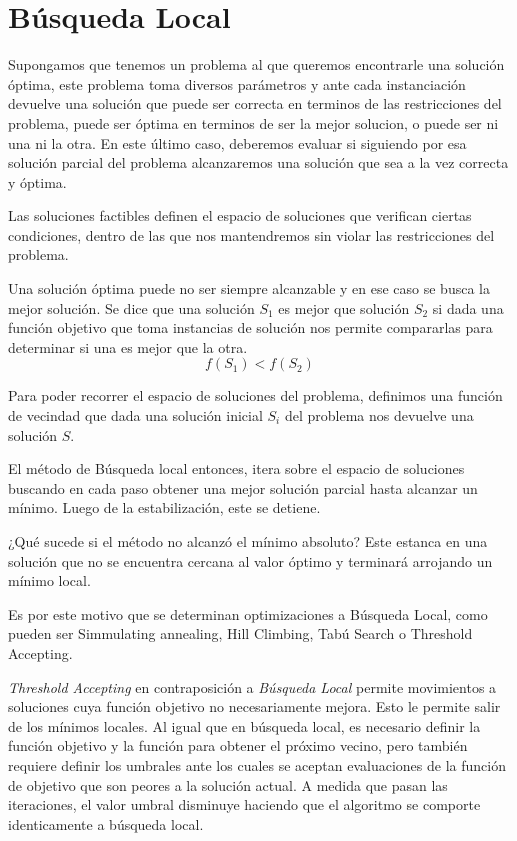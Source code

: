 \documentclass[a4paper,spanish]{article}
\begin{document}
\section{Búsqueda Local}

Supongamos que tenemos un problema al que queremos encontrarle una solución
óptima, este problema toma diversos parámetros y ante cada instanciación
devuelve una solución que puede ser correcta en terminos de las restricciones
del problema, puede ser óptima en terminos de ser la mejor solucion, o puede ser
ni una ni la otra. En este último caso, deberemos evaluar si siguiendo por esa
solución parcial del problema alcanzaremos una solución que sea a la vez
correcta y óptima.

Las soluciones factibles definen el espacio de soluciones que verifican ciertas
condiciones, dentro de las que nos mantendremos sin violar las restricciones del
problema.

Una solución óptima puede no ser siempre alcanzable y en ese caso se busca la
mejor solución. Se dice que una solución $S_1$ es mejor que solución $S_2$ si
dada una función objetivo  que toma instancias de solución nos permite
compararlas para determinar si una es mejor que la otra.
\begin{equation}
    f(S_1) < f(S_2) 
\end{equation}

Para poder recorrer el espacio de soluciones del problema, definimos una función
de vecindad que dada una solución inicial $S_i$ del problema nos devuelve una
solución $S$.


El método de Búsqueda local entonces, itera sobre el espacio de soluciones
buscando en cada paso obtener una mejor solución parcial hasta alcanzar un
mínimo. Luego de la estabilización, este se detiene.

¿Qué sucede si el método no alcanzó el mínimo absoluto? Este estanca
en una solución que no se encuentra cercana al valor óptimo y terminará
arrojando un mínimo local.

Es por este motivo que se determinan optimizaciones a Búsqueda Local, como
pueden ser Simmulating annealing, Hill Climbing, Tabú Search o Threshold
Accepting.

\emph{Threshold Accepting} en contraposición a \emph{Búsqueda Local} permite
movimientos a soluciones cuya función objetivo no necesariamente mejora. Esto le
permite salir de los mínimos locales. Al igual que en búsqueda local, es
necesario definir la función objetivo y la función para obtener el próximo
vecino, pero también requiere definir los umbrales ante los cuales se aceptan
evaluaciones de la función de objetivo que son peores a la solución actual.
A medida que pasan las iteraciones, el valor umbral disminuye haciendo que el
algoritmo se comporte identicamente a búsqueda local.
\end{document}
